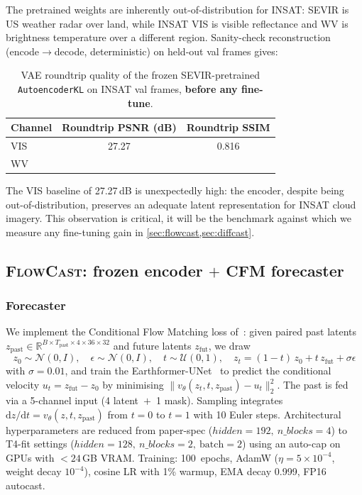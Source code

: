\documentclass[11pt,a4paper]{article}
\begin{document}
The pretrained weights are inherently out-of-distribution for {INSAT}:
{SEVIR} is US weather radar over land, while {INSAT} VIS is visible
reflectance and WV is brightness temperature over a different region.
Sanity-check reconstruction (encode$\to$decode, deterministic) on
held-out val frames gives:

\begin{table}[h]
\centering\small
\caption{{VAE} roundtrip quality of the frozen {SEVIR}-pretrained
\texttt{AutoencoderKL} on {INSAT} val frames, \textbf{before any fine-tune}.}
\label{tab:vae-baseline}
\begin{tabular}{lcc}
\toprule
Channel & Roundtrip PSNR (dB) & Roundtrip SSIM \\
\midrule
VIS & 27.27 & 0.816 \\
WV  &    &    \\  %
\bottomrule
\end{tabular}
\end{table}

The VIS baseline of 27.27\,dB is unexpectedly high: the encoder, despite
being out-of-distribution, preserves an adequate latent representation for
INSAT cloud imagery. This observation is critical, it will be the
benchmark against which we measure any fine-tuning gain in
\cref{sec:flowcast,sec:diffcast}.

\subsection{\textsc{FlowCast}: frozen encoder $+$ CFM forecaster}
\label{sec:flowcast}

\subsubsection{Forecaster}
We implement the Conditional Flow Matching loss of~\citet{flowcast2026}:
given paired past latents $z_{\text{past}}\!\in\!\mathbb{R}^{B\times
T_{\text{past}}\times 4\times 36\times 32}$ and future latents
$z_{\text{fut}}$, we draw
\begin{equation}
z_0 \sim \mathcal{N}(0, I),\quad
\epsilon \sim \mathcal{N}(0, I),\quad
t \sim \mathcal{U}(0, 1),\quad
z_t = (1-t)\,z_0 + t\,z_{\text{fut}} + \sigma\epsilon
\end{equation}
with $\sigma=0.01$, and train the {Earthformer-UNet}~\citep{gao2022earthformer}
to predict the conditional velocity $u_t = z_{\text{fut}} - z_0$ by
minimising $\|v_\theta(z_t, t, z_{\text{past}}) - u_t\|_2^2$. The past is
fed via a 5-channel input (4 latent~$+$~1 mask). Sampling integrates
$\mathrm{d}z/\mathrm{d}t = v_\theta(z, t, z_{\text{past}})$ from $t=0$ to
$t=1$ with 10 Euler steps. Architectural hyperparameters are reduced from
paper-spec ($\mathit{hidden}=192,\ n\_blocks=4$) to T4-fit settings
($\mathit{hidden}=128,\ n\_blocks=2,\ \mathrm{batch}=2$) using an
auto-cap on GPUs with $<24$\,GB VRAM. Training: 100~epochs, AdamW
($\eta=5\!\times\!10^{-4}$, weight decay $10^{-4}$), cosine LR with 1\%
warmup, EMA decay 0.999, FP16 autocast.
\end{document}
